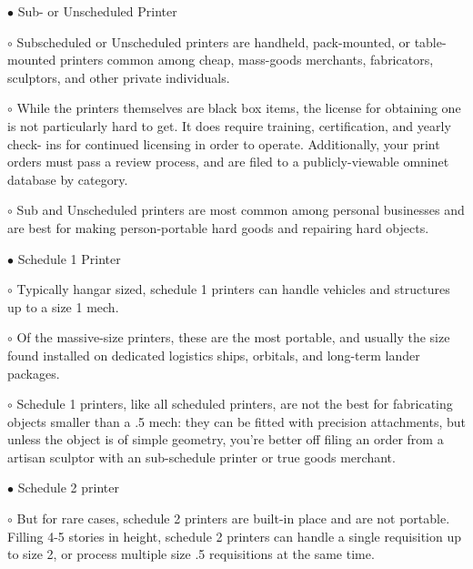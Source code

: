     $\bullet$    Sub- or Unscheduled Printer
 
             $\circ$     Subscheduled or Unscheduled printers are handheld, pack-mounted, or table- 
                 mounted printers common among cheap, mass-goods merchants, fabricators,  
                 sculptors, and other private individuals. 
 

                                                                                                           


         $\circ$     While the printers themselves are black box items, the license for obtaining one is  
             not particularly hard to get. It does require training, certification, and yearly check- 
             ins for continued licensing in order to operate. Additionally, your print orders must  
             pass a review process, and are filed to a publicly-viewable omninet database by  
             category. 
 
         $\circ$     Sub and Unscheduled printers are most common among personal businesses and  
             are best for making person-portable hard goods and repairing hard objects. 
 
$\bullet$    Schedule 1 Printer
 
         $\circ$     Typically hangar sized, schedule 1 printers can handle vehicles and structures up  
             to a size 1 mech.
 
         $\circ$     Of the massive-size printers, these are the most portable, and usually the size  
             found installed on dedicated logistics ships, orbitals, and long-term lander  
             packages. 
 
         $\circ$     Schedule 1 printers, like all scheduled printers, are not the best for fabricating  
             objects smaller than a .5 mech: they can be fitted with precision attachments, but  
             unless the object is of simple geometry, you’re better off filing an order from a  
             artisan sculptor with an sub-schedule printer or true goods merchant.  
 
              
 
$\bullet$    Schedule 2 printer
 
         $\circ$     But for rare cases, schedule 2 printers are built-in place and are not portable.  
             Filling 4-5 stories in height, schedule 2 printers can handle a single requisition up  
             to size 2, or process multiple size .5 requisitions at the same time. 
 
